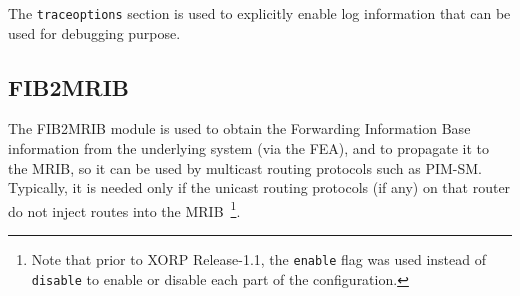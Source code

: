 The {\tt traceoptions} section is used to explicitly enable log information
that can be used for debugging purpose.

\newpage
\subsection{FIB2MRIB}
\label{sec:protocols:fib2mrib}

The FIB2MRIB module is used to obtain the Forwarding Information Base
information from the underlying system (via the FEA), and to propagate
it to the MRIB, so it can be used by multicast routing protocols
such as PIM-SM. Typically, it is needed only if the unicast routing
protocols (if any) on that router do not inject routes into the
MRIB~\footnote{Note that prior to XORP Release-1.1, the {\tt enable} flag
was used instead of {\tt disable} to enable or disable each part of the
configuration.}.

\vspace{0.1in}
\noindent{}
\vspace{0.1in}


